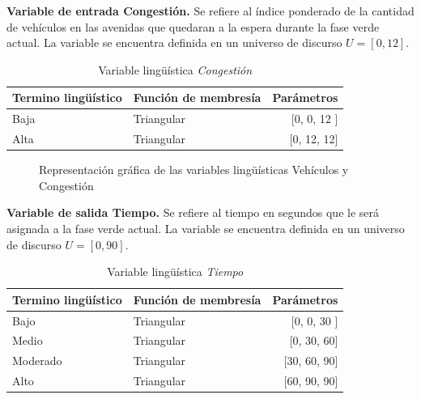 \textbf{Variable de entrada Congestión.} Se refiere al índice ponderado de la cantidad de vehículos en las avenidas que quedaran a la espera durante la fase verde actual. La variable se encuentra definida en un universo de discurso $U = [0,12]$.

\begin{table}[!h]
	\centering
	\begin{tabular}{llr} \toprule
		Termino lingüístico & Función de membresía & Parámetros \\ \midrule
		Baja & Triangular & [0, 0, 12 ] \\
		Alta & Triangular & [0, 12, 12] \\ \bottomrule
	\end{tabular}
	\caption{Variable lingüística \textit{Congestión}}
\end{table}

\begin{figure}[H]
	\centering
	\caption[Gráficas de las variables lingüísticas vehículos y congestión]{Representación gráfica de las variables lingüísticas Vehículos y Congestión }
\end{figure}

\newpage
\textbf{Variable de salida Tiempo.} Se refiere al tiempo en segundos que le será asignada a la fase verde actual. La variable se encuentra definida en un universo de discurso $U = [0,90]$.

\begin{table}[!h]
	\centering
	\begin{tabular}{llr} \toprule
		Termino lingüístico & Función de membresía & Parámetros \\ \midrule
		Bajo & Triangular & [0, 0, 30 ] \\
		Medio & Triangular & [0, 30, 60] \\
		Moderado & Triangular & [30, 60, 90] \\
		Alto & Triangular & [60, 90, 90] \\ \bottomrule
	\end{tabular}
	\caption{Variable lingüística \textit{Tiempo}}
\end{table}

